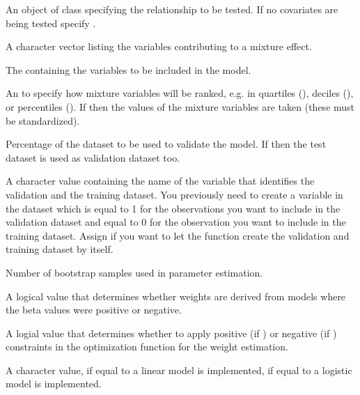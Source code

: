 \documentclass[a4paper]{book}
\begin{document}
%
\begin{Arguments}
\begin{ldescription}
\item[\code{formula}] An object of class  specifying the relationship to be tested. If no
covariates are being tested specify .

\item[\code{mix\_name}] A character vector listing the variables contributing to a mixture effect.

\item[\code{data}] The  containing the variables to be included in the model.

\item[\code{q}] An  to specify how mixture variables will be ranked, e.g. in quartiles
(), deciles (), or percentiles (). If  then
the values of the mixture variables are taken (these must be standardized).

\item[\code{validation}] Percentage of the dataset to be used to validate the model. If
 then the test dataset is used as validation dataset too.

\item[\code{valid\_var}] A character value containing the name of the variable that identifies the validation
and the training dataset. You previously need to create a variable in the dataset which is equal to 1
for the observations you want to include in the validation dataset and equal to 0 for the observation
you want to include in the training dataset. Assign  if you want to let the
function create the validation and training dataset by itself.

\item[\code{b}] Number of bootstrap samples used in parameter estimation.

\item[\code{b1\_pos}] A logical value that determines whether weights are derived from models where the beta
values were positive or negative.

\item[\code{b1\_constr}] A logial value that determines whether to apply positive (if ) or
negative (if ) constraints in the optimization function for the weight estimation.

\item[\code{family}] A character value, if equal to  a linear model is implemented, if
equal to  a logistic model is implemented.


\end{ldescription}
\end{Arguments}
\end{document}
